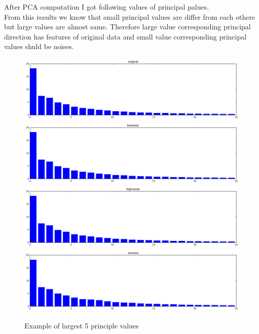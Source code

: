 \documentclass[a4paper,11pt]{article}
\begin{document}
After PCA computation I got following values of principal palues. \\
From this results we know that small principal values are differ from each others but large values are almost same. Therefore large value corresponding principal direction has features of original data and small value corresponding principal values shuld be noises.
\begin{figure}[htbp]
  \includegraphics[scale=0.4]{orgev.png}
  \includegraphics[scale=0.4]{lowev.png}
  \includegraphics[scale=0.4]{stev.png}
  \includegraphics[scale=0.4]{exev.png}
  \caption{Example of largest 5 principle values}
\end{figure}
\end{document}
